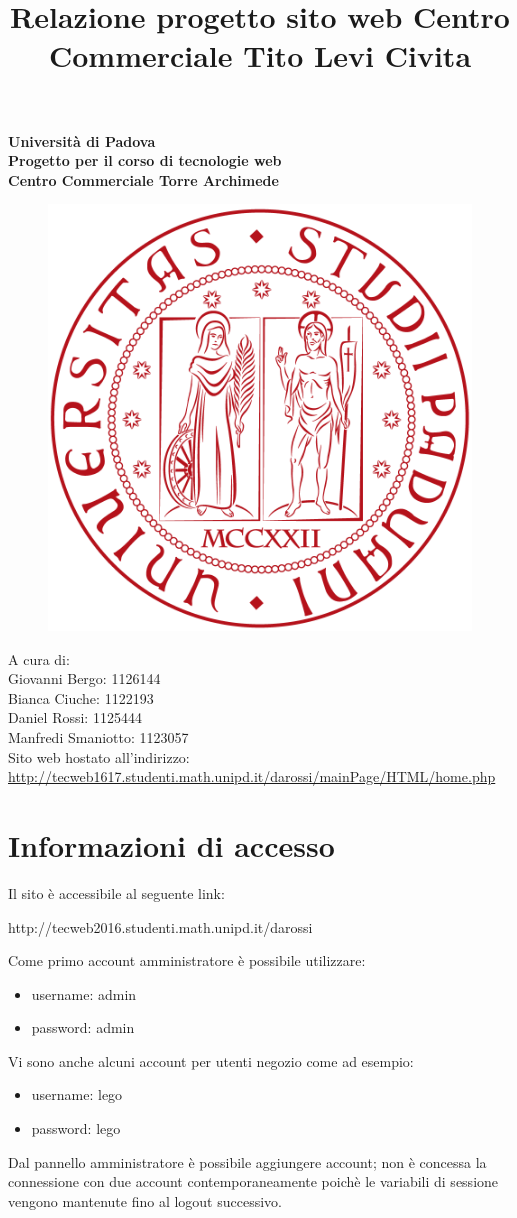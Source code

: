 \documentclass[a4paper,12pt]{article}
\begin{document}
\title{Relazione progetto sito web Centro Commerciale Tito Levi Civita}
\begin{titlepage}
	\pagestyle{empty}
	\centering
	\vfill
	{
		\bfseries
		\vskip2cm
		\Large Università di Padova\\
		\vfill
		\Large Progetto per il corso di tecnologie web\\
		\Huge Centro Commerciale Torre Archimede\\
		\vfill
		
		\begin{figure}
			\centering
			\includegraphics[width=0.6\linewidth]{images/LogoPadova}
		\end{figure}
		A cura di:\\
		\Large Giovanni Bergo:		1126144\\ Bianca Ciuche:		1122193 \\Daniel Rossi:		1125444\\ Manfredi Smaniotto:	1123057\\
		\vfill
		Sito web hostato all'indirizzo: \url{http://tecweb1617.studenti.math.unipd.it/darossi/mainPage/HTML/home.php}\\
		\vfill
	}
\end{titlepage}
\tableofcontents
\pagestyle{empty}
\newpage
\pagestyle{fancy}
\fancyhead[RE,LO]{}
\fancyfoot[CE,CO]{}
\section{Informazioni di accesso}
Il sito è accessibile al seguente link:
\begin{center}
	http://tecweb2016.studenti.math.unipd.it/darossi
\end{center}
Come primo account amministratore è possibile utilizzare:
\begin{itemize}
	\item username: admin
	\item password: admin
\end{itemize}
Vi sono anche alcuni account per utenti negozio come ad esempio:
\begin{itemize}
	\item username: lego
	\item password: lego
\end{itemize}
Dal pannello amministratore è possibile aggiungere account; non è concessa la connessione con due account contemporaneamente poichè le variabili di sessione vengono mantenute fino al logout successivo.
\end{document}
